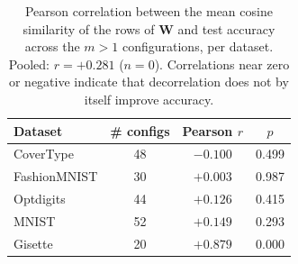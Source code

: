 \begin{table}[ht]
\centering\small
\begin{tabular}{lccc}
\toprule
Dataset & \# configs & Pearson $r$ & $p$ \\
\midrule
CoverType & 48 & $-0.100$ & 0.499 \\
FashionMNIST & 30 & $+0.003$ & 0.987 \\
Optdigits & 44 & $+0.126$ & 0.415 \\
MNIST & 52 & $+0.149$ & 0.293 \\
Gisette & 20 & $+0.879$ & 0.000 \\
\bottomrule
\end{tabular}
\caption{Pearson correlation between the mean cosine similarity of the rows of $\mathbf{W}$ and test accuracy across the $m>1$ configurations, per dataset. Pooled: $r=+0.281$ ($n=0$). Correlations near zero or negative indicate that decorrelation does not by itself improve accuracy.}
\label{tab:feeding_decorrelation}
\end{table}

